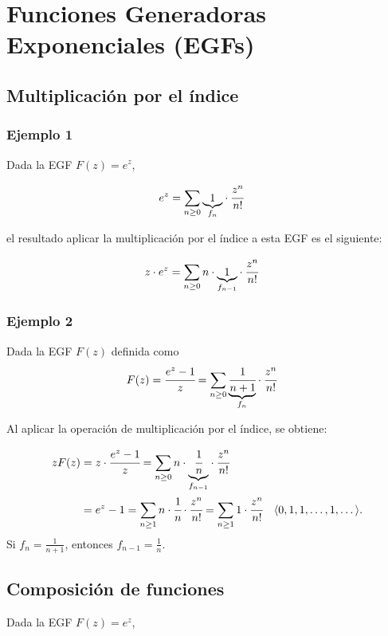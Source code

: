 \section{Funciones Generadoras Exponenciales (EGFs)}


\subsection{Multiplicación por el índice}

\subsubsection{Ejemplo 1}
Dada la EGF $F(z)=e^z$, 

\begin{align*}
e^z&=\sum_{n\geq0}{\underset{f_n}{\underbrace{1}}\cdot\cfrac{z^{n}}{n!}}
\end{align*}

el resultado aplicar la multiplicación por el índice a esta EGF es el siguiente:

\begin{align*}
z\cdot e^z&=\sum_{n\geq0}{n\cdot \underset{f_{n-1}}{\underbrace{1}}\cdot\cfrac{z^{n}}{n!}}
\end{align*}

\subsubsection{Ejemplo 2}

Dada la EGF $F(z)$ definida como
\begin{align*}
F(z)=\cfrac{e^z-1}{z}&=\sum_{n\geq0}{\underset{f_n}{\underbrace{\cfrac{1}{n+1}}}\cdot \cfrac{z^{n}}{n!}}
\end{align*}

Al aplicar la operación de multiplicación por el índice, se obtiene:

\begin{align*}
zF(z)&=z\cdot \cfrac{e^z-1}{z}=\sum_{n\geq0}{n\cdot \underset{f_{n-1}}{\underbrace{\cfrac{1}{n}}}\cdot \cfrac{z^{n}}{n!}}\\
&=e^z-1=\sum_{n\geq1}{n\cdot\cfrac{1}{n}\cdot \cfrac{z^{n}}{n!}}=\sum_{n\geq1}{1\cdot \cfrac{z^{n}}{n!}} & \langle0,1,1,\dots,1,\dots\rangle.
\end{align*}
Si $f_n=\frac{1}{n+1}$, entonces $f_{n-1}=\frac{1}{n}$.

\subsection{Composición de funciones}

Dada la EGF $F(z)=e^z$, 

